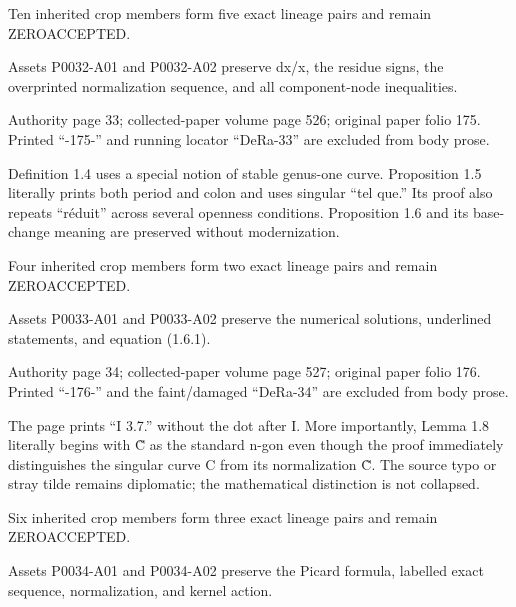 \documentclass[11pt,a4paper]{article}
\begin{document}
Ten inherited crop members form five exact lineage pairs and remain ZERO\textunderscore{}ACCEPTED.

Assets P0032-A01 and P0032-A02 preserve dx/x, the residue signs, the overprinted normalization sequence, and all component-node inequalities.


\par\medskip
\hypertarget{D018-P0033}{}
\par\smallskip
Authority page 33; collected-paper volume page 526; original paper folio 175. Printed “-175-” and running locator “DeRa-33” are excluded from body prose.

Definition 1.4 uses a special notion of stable genus-one curve. Proposition 1.5 literally prints both period and colon and uses singular “tel que.” Its proof also repeats “réduit” across several openness conditions. Proposition 1.6 and its base-change meaning are preserved without modernization.

Four inherited crop members form two exact lineage pairs and remain ZERO\textunderscore{}ACCEPTED.

Assets P0033-A01 and P0033-A02 preserve the numerical solutions, underlined statements, and equation (1.6.1).


\par\medskip
\hypertarget{D018-P0034}{}
\par\smallskip
Authority page 34; collected-paper volume page 527; original paper folio 176. Printed “-176-” and the faint/damaged “DeRa-34” are excluded from body prose.

The page prints “I 3.7.” without the dot after I. More importantly, Lemma 1.8 literally begins with C̃ as the standard n-gon even though the proof immediately distinguishes the singular curve C from its normalization C̃. The source typo or stray tilde remains diplomatic; the mathematical distinction is not collapsed.

Six inherited crop members form three exact lineage pairs and remain ZERO\textunderscore{}ACCEPTED.

Assets P0034-A01 and P0034-A02 preserve the Picard formula, labelled exact sequence, normalization, and kernel action.
\end{document}
